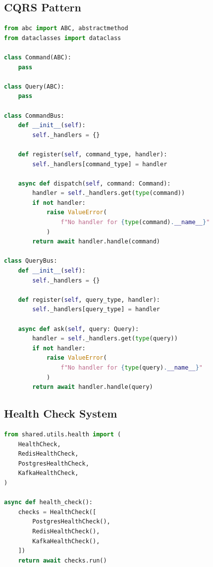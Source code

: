\subsection{CQRS Pattern}

\begin{lstlisting}[language=Python, caption=Command and Query Bus]
from abc import ABC, abstractmethod
from dataclasses import dataclass

class Command(ABC):
    pass

class Query(ABC):
    pass

class CommandBus:
    def __init__(self):
        self._handlers = {}

    def register(self, command_type, handler):
        self._handlers[command_type] = handler

    async def dispatch(self, command: Command):
        handler = self._handlers.get(type(command))
        if not handler:
            raise ValueError(
                f"No handler for {type(command).__name__}"
            )
        return await handler.handle(command)

class QueryBus:
    def __init__(self):
        self._handlers = {}

    def register(self, query_type, handler):
        self._handlers[query_type] = handler

    async def ask(self, query: Query):
        handler = self._handlers.get(type(query))
        if not handler:
            raise ValueError(
                f"No handler for {type(query).__name__}"
            )
        return await handler.handle(query)
\end{lstlisting}

\subsection{Health Check System}

\begin{lstlisting}[language=Python, caption=Health Check Implementation]
from shared.utils.health import (
    HealthCheck,
    RedisHealthCheck,
    PostgresHealthCheck,
    KafkaHealthCheck,
)

async def health_check():
    checks = HealthCheck([
        PostgresHealthCheck(),
        RedisHealthCheck(),
        KafkaHealthCheck(),
    ])
    return await checks.run()
\end{lstlisting}

\clearpage

